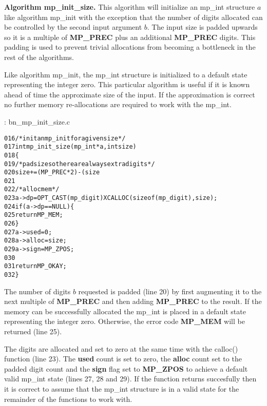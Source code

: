 \documentclass[b5paper]{book}
\begin{document}
\textbf{Algorithm mp\_init\_size.}
This algorithm will initialize an mp\_int structure $a$ like algorithm mp\_init with the exception that the number of 
digits allocated can be controlled by the second input argument $b$.  The input size is padded upwards so it is a 
multiple of \textbf{MP\_PREC} plus an additional \textbf{MP\_PREC} digits.  This padding is used to prevent trivial 
allocations from becoming a bottleneck in the rest of the algorithms.

Like algorithm mp\_init, the mp\_int structure is initialized to a default state representing the integer zero.  This 
particular algorithm is useful if it is known ahead of time the approximate size of the input.  If the approximation is
correct no further memory re-allocations are required to work with the mp\_int.

\vspace{+3mm}\begin{small}
\hspace{-5.1mm}{\bf File}: bn\_mp\_init\_size.c
\vspace{-3mm}
\begin{alltt}
016   /* init an mp_init for a given size */
017   int mp_init_size (mp_int * a, int size)
018   \{
019     /* pad size so there are always extra digits */
020     size += (MP_PREC * 2) - (size % MP_PREC);    
021     
022     /* alloc mem */
023     a->dp = OPT_CAST(mp_digit) XCALLOC (sizeof (mp_digit), size);
024     if (a->dp == NULL) \{
025       return MP_MEM;
026     \}
027     a->used  = 0;
028     a->alloc = size;
029     a->sign  = MP_ZPOS;
030   
031     return MP_OKAY;
032   \}
\end{alltt}
\end{small}

The number of digits $b$ requested is padded (line 20) by first augmenting it to the next multiple of 
\textbf{MP\_PREC} and then adding \textbf{MP\_PREC} to the result.  If the memory can be successfully allocated the 
mp\_int is placed in a default state representing the integer zero.  Otherwise, the error code \textbf{MP\_MEM} will be 
returned (line 25).  

The digits are allocated and set to zero at the same time with the calloc() function (line 23).  The 
\textbf{used} count is set to zero, the \textbf{alloc} count set to the padded digit count and the \textbf{sign} flag set 
to \textbf{MP\_ZPOS} to achieve a default valid mp\_int state (lines 27, 28 and 29).  If the function 
returns succesfully then it is correct to assume that the mp\_int structure is in a valid state for the remainder of the 
functions to work with.
\end{document}
